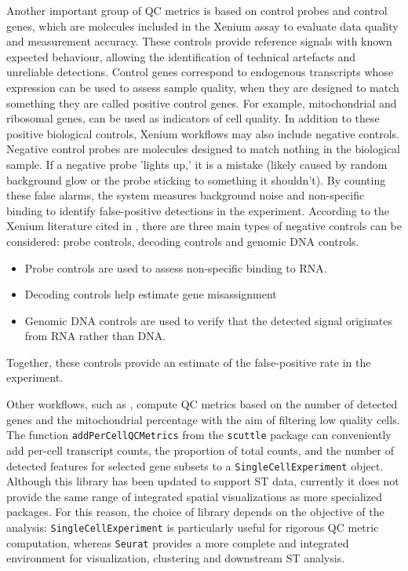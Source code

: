 Another important group of QC metrics is based on control probes and control genes, which are molecules included in the Xenium assay to evaluate data quality and measurement accuracy. These controls provide reference signals with known expected behaviour, allowing the identification of technical artefacts and unreliable detections. Control genes correspond to endogenous transcripts whose expression can be used to assess sample quality, when they are designed to match something they are called positive control genes. For example, mitochondrial and ribosomal genes, can be used as indicators of cell quality. In addition to these positive biological controls, Xenium workflows may also include negative controls. Negative control probes are molecules designed to match nothing in the biological sample. If a negative probe 'lights up,' it is a mistake (likely caused by random background glow or the probe sticking to something it shouldn’t). By counting these false alarms, the system measures background noise and non-specific binding to identify false-positive detections in the experiment.  According to the Xenium literature cited in \cite{Voyager}, there are three main types of negative controls can be considered: probe controls, decoding controls and genomic DNA controls. 
\begin{itemize}
    \item Probe controls are used to assess non-specific binding to RNA.
    \item Decoding controls help estimate gene misassignment
    \item Genomic DNA controls are used to verify that the detected signal originates from RNA rather than DNA. 
\end{itemize}
Together, these controls provide an estimate of the false-positive rate in the experiment.

Other workflows, such as \cite{OSTA}, compute QC metrics based on the number of detected genes and the mitochondrial percentage with the aim of filtering low quality cells. The function \verb|addPerCellQCMetrics| from the \texttt{scuttle} package can conveniently add per-cell transcript counts, the proportion of total counts, and the number of detected features for selected gene subsets to a \texttt{SingleCellExperiment} object. Although this library has been updated to support ST data, currently it does not provide the same range of integrated spatial visualizations as more specialized packages. For this reason, the choice of library depends on the objective of the analysis: \texttt{SingleCellExperiment} is particularly useful for rigorous QC metric computation, whereas \texttt{Seurat} provides a more complete and integrated environment for visualization, clustering and downstream ST analysis.

